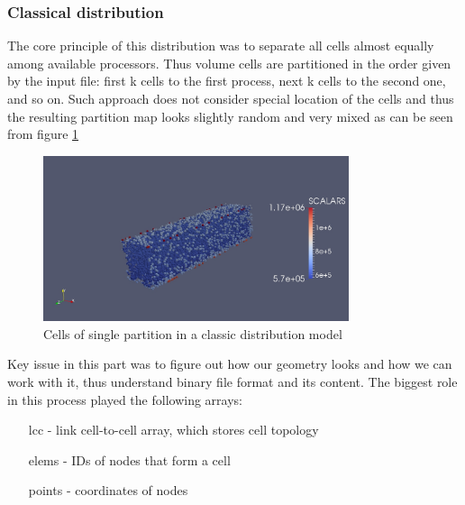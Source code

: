 \documentclass{article}
\begin{document}
\subsubsection{Classical distribution}
The core principle of this distribution was to separate all cells almost equally among available processors. Thus volume cells are partitioned in the order given by the input file: first k cells to the first process, next k cells to the second one, and so on. Such approach does not consider special location of the cells and thus the resulting partition map looks slightly random and very mixed as can be seen from figure \ref{fig:4}
\begin{figure}[h!]
	\begin{center}
		\includegraphics[width=0.8\textwidth]{pent-classic.jpg}
		\caption{Cells of single partition in a classic distribution model}
		\label{fig:4}
	\end{center}
\end{figure}
Key issue in this part was to figure out how our geometry looks and how we can work with it, thus understand binary file format and its content. The biggest role in this process played the following arrays:
\begin{itemize}
	\item[lcc] - link cell-to-cell array, which stores cell topology
	\item[elems] - IDs of nodes that form a cell
	\item[points] - coordinates of nodes
\end{itemize}
\end{document}
